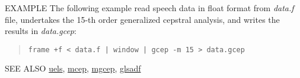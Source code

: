 \begin{qsection}{EXAMPLE}
The following example read speech data in float format from {\em data.f}
file, undertakes the 15-th order generalized cepstral analysis,
and writes the results in {\em data.gcep}:
\begin{quote}
 \verb!frame +f < data.f | window | gcep -m 15 > data.gcep!
\end{quote} 
\end{qsection}

\begin{qsection}{SEE ALSO}
\hyperlink{uels}{uels},
\hyperlink{mcep}{mcep},
\hyperlink{mgcep}{mgcep},
\hyperlink{glsadf}{glsadf}
\end{qsection}
